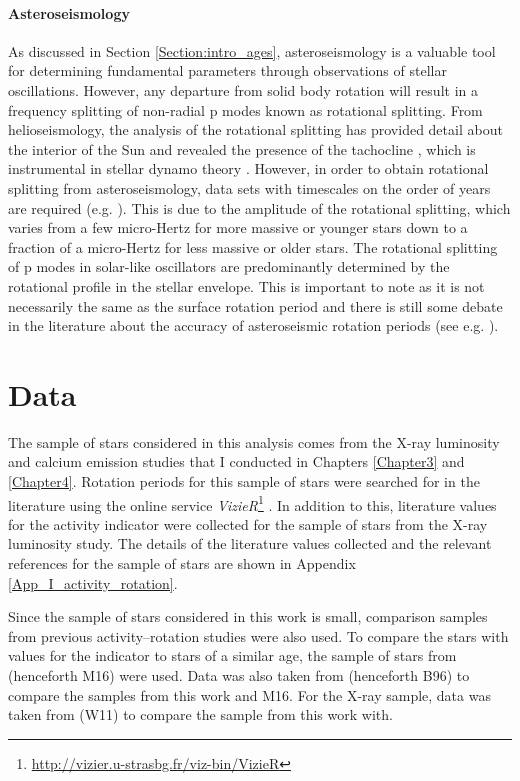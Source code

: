 \paragraph{Asteroseismology}
As discussed in Section \ref{Section:intro_ages}, asteroseismology is a valuable tool for determining fundamental parameters through observations of stellar oscillations. However, any departure from solid body rotation will result in a frequency splitting of non-radial p modes known as rotational splitting. From helioseismology, the analysis of the rotational splitting has provided detail about the interior of the Sun and revealed the presence of the tachocline \citep{Spiegel_Zahn_1992}, which is instrumental in stellar dynamo theory . However, in order to obtain rotational splitting from asteroseismology, data sets with timescales on the order of years are required (e.g. \citealt{Davies_etal_2015}). This is due to the amplitude of the rotational splitting, which varies from a few micro-Hertz for more massive or younger stars down to a fraction of a micro-Hertz for less massive or older stars. The rotational splitting of p modes in solar-like oscillators are predominantly determined by the rotational profile in the stellar envelope. This is important to note as it is not necessarily the same as the surface rotation period and there is still some debate in the literature about the accuracy of asteroseismic rotation periods (see e.g. \citealt{Barnes_etal_2016_aspect_gyro}).

\section{Data}
\label{Chp5_data}

The sample of stars considered in this analysis comes from the X-ray luminosity and calcium emission studies that I conducted in Chapters \ref{Chapter3} and \ref{Chapter4}. Rotation periods for this sample of stars were searched for in the literature using the online service \textit{VizieR}\footnote{\url{http://vizier.u-strasbg.fr/viz-bin/VizieR}} \citep{Ochsenbein_etal_2000}. In addition to this, literature values for the \Rprime activity indicator were collected for the sample of stars from the X-ray luminosity study. The details of the literature values collected and the relevant references for the sample of stars are shown in Appendix \ref{App_I_activity_rotation}.

Since the sample of stars considered in this work is small, comparison samples from previous activity--rotation studies were also used. To compare the stars with values for the \Rprime indicator to stars of a similar age, the sample of stars from \citet{Metcalfe_etal_2016} (henceforth M16) were used. Data was also taken from \citet{Baliunas_etal_1996} (henceforth B96) to compare the \Rprime samples from this work and M16. For the X-ray sample, data was taken from \citet{Wright_etal_2011} (W11) to compare the sample from this work with.

